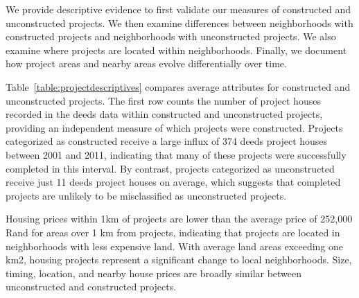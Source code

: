 \documentclass[12pt]{article}
\begin{document}



We provide descriptive evidence to first validate our measures of constructed and unconstructed projects.  We then examine differences between neighborhoods with constructed projects and neighborhoods with unconstructed projects.  We also examine where projects are located within neighborhoods.  Finally, we document how project areas and nearby areas evolve differentially over time.  

Table~\ref{table:projectdescriptives} compares average attributes for constructed and unconstructed projects.  The first row counts the number of project houses recorded in the deeds data within constructed and unconstructed projects, providing an independent measure of which projects were constructed.  Projects categorized as constructed receive a large influx of 374 deeds project houses between 2001 and 2011, indicating that many of these projects were successfully completed in this interval.  By contrast, projects categorized as unconstructed receive just 11 deeds project houses on average, which suggests that completed projects are unlikely to be misclassified as unconstructed projects.   

Housing prices within 1km of projects are lower than the average price of 252,000 Rand for areas over 1 km from projects, indicating that projects are located in neighborhoods with less expensive land.  With average land areas exceeding one km2, housing projects represent a significant change to local neighborhoods.  Size, timing, location, and nearby house prices are broadly similar between unconstructed and constructed projects.  
\end{document}
